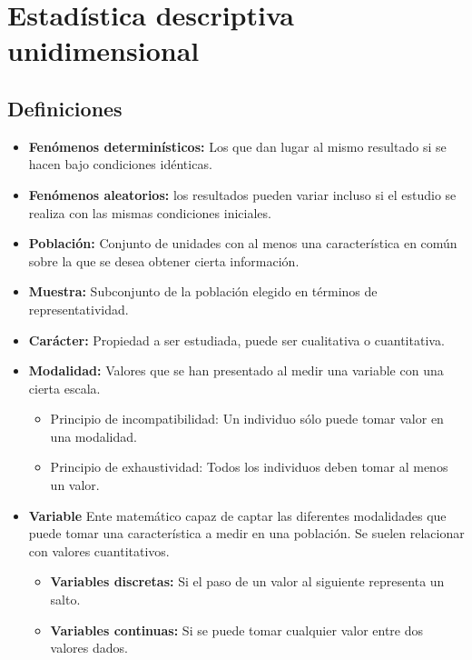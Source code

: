 \chapter{Estadística descriptiva unidimensional}

\section{Definiciones}

\begin{itemize}
    \item \textbf{Fenómenos determinísticos:} Los que dan lugar al mismo resultado si se hacen bajo condiciones idénticas.
    \item \textbf{Fenómenos aleatorios:} los resultados pueden variar incluso si el estudio se realiza con las mismas condiciones iniciales.
    \item \textbf{Población:} Conjunto de unidades con al menos una característica en común sobre la que se desea obtener cierta información.
    \item \textbf{Muestra:} Subconjunto de la población elegido en términos de representatividad.
    \item \textbf{Carácter:} Propiedad a ser estudiada, puede ser cualitativa o cuantitativa.
    \item \textbf{Modalidad:} Valores que se han presentado al medir una variable con una cierta escala.

          \begin{itemize}
              \item Principio de incompatibilidad: Un individuo sólo puede tomar valor en una modalidad.
              \item Principio de exhaustividad: Todos los individuos deben tomar al menos un valor.
          \end{itemize}

    \item \textbf{Variable} Ente matemático capaz de captar las diferentes modalidades que puede tomar una característica a medir en una población. Se suelen relacionar con valores cuantitativos.
    \begin{itemize}
        \item \textbf{Variables discretas:} Si el paso de un valor al siguiente representa un salto.
        \item \textbf{Variables continuas:} Si se puede tomar cualquier valor entre dos valores dados.
    \end{itemize}
\end{itemize}

